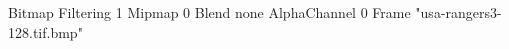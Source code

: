 {Bitmap
	{Filtering 1}
	{Mipmap 0}
	{Blend none}
	{AlphaChannel 0}
	{Frame "usa-rangers3-128.tif.bmp"}
}
